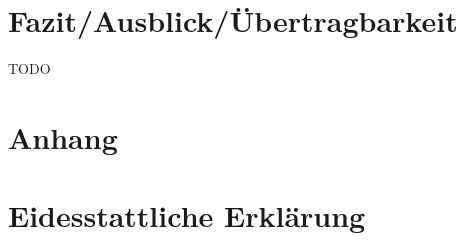 \documentclass[a4paper,11pt,singlespacing]{article}
\begin{document}
\section{Fazit/Ausblick/Übertragbarkeit}\label{sec:Fazit/Ausblick/Übertragbarkeit}
	TODO





\listoffigures
{}

\lstlistoflistings
{}

\newpage

\section*{Anhang}\label{Anhang}

\newpage

\section*{Eidesstattliche Erklärung}\label{sec:Eidesstattliche Erklärung}
\end{document}
